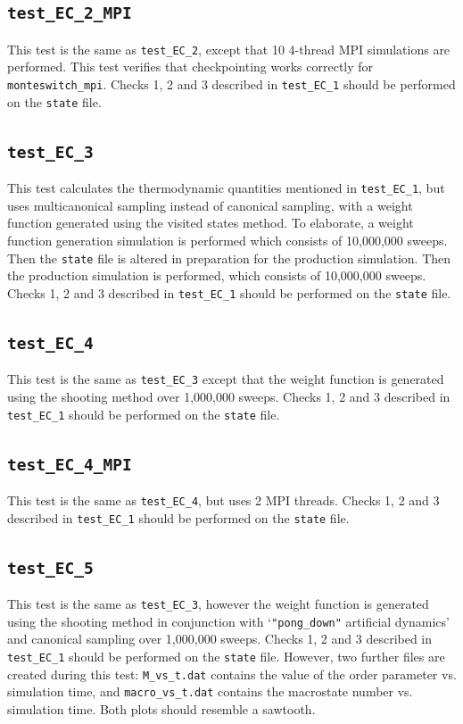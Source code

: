 \documentclass{report}
\begin{document}
\subsection{\texttt{test\_EC\_2\_MPI}}
This test is the same as \texttt{test\_EC\_2}, except that 10 4-thread MPI simulations are performed. This test verifies 
that checkpointing works correctly for \texttt{monteswitch\_mpi}. Checks 1, 2 and 3 described in \texttt{test\_EC\_1} should be 
performed on the \texttt{state} file.


\subsection{\texttt{test\_EC\_3}}
This test calculates the thermodynamic quantities mentioned in \texttt{test\_EC\_1}, but uses multicanonical sampling instead
of canonical sampling, with a weight function generated using the visited states method. To elaborate, a weight function generation 
simulation is performed which consists of 10,000,000 sweeps. Then the \texttt{state} file is altered in preparation 
for the production simulation. Then the production simulation is performed, which consists of 10,000,000 sweeps.
Checks 1, 2 and 3 described in \texttt{test\_EC\_1} should be performed on the \texttt{state} file.


\subsection{\texttt{test\_EC\_4}}
This test is the same as \texttt{test\_EC\_3} except that the weight function is generated using the shooting method over
1,000,000 sweeps. Checks 1, 2 and 3 described in \texttt{test\_EC\_1} should be performed on the \texttt{state} file.


\subsection{\texttt{test\_EC\_4\_MPI}}
This test is the same as \texttt{test\_EC\_4}, but uses 2 MPI threads.
Checks 1, 2 and 3 described in \texttt{test\_EC\_1} should be performed on the \texttt{state} file.


\subsection{\texttt{test\_EC\_5}}
This test is the same as \texttt{test\_EC\_3}, however the weight function is generated using the shooting method 
in conjunction with `\texttt{"pong\_down"} artificial dynamics' and canonical sampling over 1,000,000 sweeps. 
Checks 1, 2 and 3 described in \texttt{test\_EC\_1} should be performed on the \texttt{state} file.
However, two further files are created during this test: \texttt{M\_vs\_t.dat} contains the value of the order parameter vs. 
simulation time, and \texttt{macro\_vs\_t.dat} contains the macrostate number vs. simulation time. Both plots should resemble a sawtooth.
\end{document}
